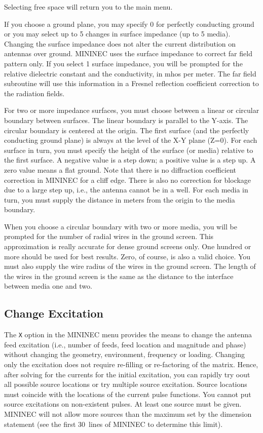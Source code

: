 \documentclass[12pt]{article}
\begin{document}
Selecting free space will return you to the main menu.

If you choose a ground plane, you may specify 0 for perfectly conducting
ground or you may select up to 5 changes in surface impedance (up to 5
media). Changing the surface impedance does not alter the current
distribution on antennas over ground. MININEC uses the surface impedance
to correct far field pattern only. If you select 1 surface impedance,
you will be prompted for the relative dielectric constant and the
conductivity, in mhos per meter. The far field subroutine will use this
information in a Fresnel reflection coefficient correction to the
radiation fields.

For two or more impedance surfaces, you must choose between a linear or
circular boundary between surfaces. The linear boundary is parallel to
the Y-axis. The circular boundary is centered at the origin. The first
surface (and the perfectly conducting ground plane) is always at the
level of the X-Y plane (Z=0). For each surface in turn, you must specify
the height of the surface (or media) relative to the first surface. A
negative value is a step down; a positive value is a step up. A zero
value means a flat ground. Note that there is no diffraction coefficient
correction in MININEC for a cliff edge. There is also no correction for
blockage due to a large step up, i.e., the antenna cannot be in a well.
For each media in turn, you must supply the distance in meters from the
origin to the media boundary.

When you choose a circular boundary with two or more media, you will be
prompted for the number of radial wires in the ground screen. This
approximation is really accurate for dense ground screens only. One
hundred or more should be used for best results. Zero, of course, is
also a valid choice. You must also supply the wire radius of the wires
in the ground screen. The length of the wires in the ground screen is
the same as the distance to the interface between media one and two.

\subsection{Change Excitation}
The \verb+X+ option in the MININEC menu provides the means to change the
antenna feed excitation (i.e., number of feeds, feed location and
magnitude and phase) without changing the geometry, environment,
frequency or loading. Changing only the excitation does not require
re-filling or re-factoring of the matrix. Hence, after solving for the
currents for the initial excitation, you can rapidly try oout all
possible source locations or try multiple source excitation. Source
locations must coincide with the locations of the current pulse
functions. You cannot put source excitations on non-existent pulses. At
least one source must be given. MININEC will not allow more sources than
the maximum set by the dimension statement (see the first 30~lines of
MININEC to determine this limit).
\end{document}
